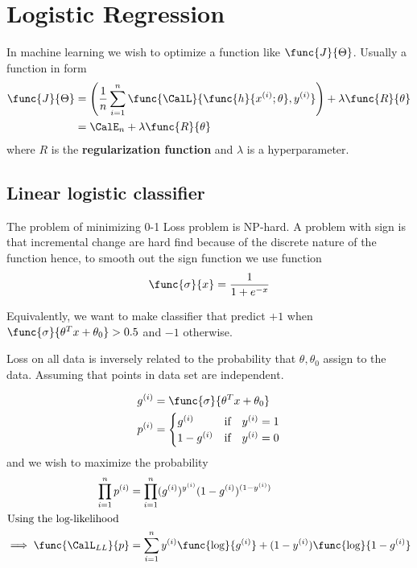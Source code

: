 \chapter{Logistic Regression}
In machine learning we wish to optimize a function like \(\func{J}{\Theta}\). Usually a function in form 
\begin{align*}
    \func{J}{\Theta} &= \left(\dfrac{1}{n} \sum_{i = 1}^n \func{\CalL}{\func{h}{x^{(i)}; \theta} , y^{(i)}} \right) + \lambda \func{R}{\theta} \\
    &= \CalE_n + \lambda \func{R}{\theta}
\end{align*}
where \(R\) is the \textbf{regularization function} and \(\lambda\) is a hyperparameter.

\section{Linear logistic classifier}
The problem of minimizing 0-1 Loss problem is NP-hard. A problem with sign is that incremental change are hard find because of the discrete nature of the function hence, to smooth out the sign function we use  function 
\begin{equation*}
    \func{\sigma}{x} = \dfrac{1}{1 + e^{-x}}
\end{equation*}

Equivalently, we want to make classifier that predict \(+1\) when \(\func{\sigma}{\theta^T x+ \theta_0} > 0.5\) and \(-1\) otherwise. 

Loss on all data is inversely related to the probability that \(\theta , \theta_0\) assign to the data. Assuming that points in data set are independent.

\begin{align*}
    g^{(i)} &=  \func{\sigma}{\theta^T x + \theta_0} \\
    p^{(i)} &= \begin{cases}
        g^{(i)} & \text{if} \quad y^{(i)} = 1\\
        1 - g^{(i)} & \text{if} \quad y^{(i)} = 0\\
    \end{cases} 
\end{align*}
and we wish to maximize the probability
\begin{align*}
    \prod_{i = 1}^n p^{(i)} &= \prod_{i = 1}^n (g^{(i)})^{y^{(i)}} ( 1 - g^{(i)})^{(1 - y^{(i)})} \\
    \intertext{Using the log-likelihood}
    \implies \func{\CalL_{LL}}{p} &= \sum_{i = 1}^n y^{(i)} \func{\log}{g^{(i)}} + (1 - y^{(i)}) \func{\log}{1 - g^{(i)}} 
\end{align*}
